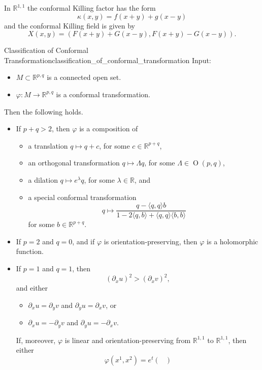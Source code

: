 \documentclass{article}
\begin{document}
In $\mathbb{R}^{1,1}$ the conformal Killing factor has the form
\[ \kappa(x,y) = f(x+y) + g(x-y) \]
and the conformal Killing field is given by
\[ X(x,y) = (F(x+y) + G(x-y), F(x+y) - G(x-y)). \]

\begin{theorem}{Classification of Conformal Transformation}{classification_of_conformal_transformation}
    Input:
    \begin{itemize}
        \item $M\subset \mathbb{R}^{p,q}$ is a connected open set.
        \item $\varphi: M \rightarrow \mathbb{R}^{p,q}$ is a conformal transformation.
    \end{itemize}
    Then the following holds.
    \begin{itemize}
        \item If $p+q>2$, then $\varphi$ is a composition of
        \begin{itemize}
            \item a translation $q \mapsto q + c$, for some $c\in\mathbb{R}^{p+q}$,
            \item an orthogonal transformation $q\mapsto \Lambda q$, for some $\Lambda \in \operatorname{O}(p,q)$,
            \item a dilation $q\mapsto e^\lambda q$, for some $\lambda\in\mathbb{R}$, and
            \item a special conformal transformation
            \[ q\mapsto \frac{q - \langle q,q \rangle b}{1 - 2\langle q,b\rangle + \langle q,q\rangle \langle b,b\rangle} \]
            for some $b\in\mathbb{R}^{p+q}$.
        \end{itemize}
        \item If $p=2$ and $q=0$, and if $\varphi$ is orientation-preserving, then $\varphi$ is a holomorphic function.
        \item If $p=1$ and $q=1$, then
        \[ (\partial_x u)^2 > (\partial_x v)^2, \]
        and either
        \begin{itemize}
            \item $\partial_x u = \partial_y v$ and $\partial_y u = \partial_x v$, or
            \item $\partial_x u = -\partial_y v$ and $\partial_y u = -\partial_x v$.
        \end{itemize}
        If, moreover, $\varphi$ is linear and orientation-preserving from $\mathbb{R}^{1,1}$ to $\mathbb{R}^{1,1}$, then either
        \[ \varphi(x^1,x^2) = e^t \begin{pmatrix}

\end{pmatrix}\]
\end{itemize}
\end{theorem}
\end{document}
